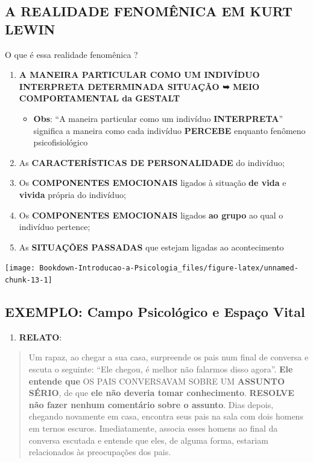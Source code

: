 \documentclass[
]{book}
\providecommand{\tightlist}{%
  \setlength{\itemsep}{0pt}\setlength{\parskip}{0pt}}
\begin{document}
\hypertarget{a-realidade-fenomuxeanica-em-kurt-lewin}{%
\subsection{A REALIDADE FENOMÊNICA EM KURT LEWIN}\label{a-realidade-fenomuxeanica-em-kurt-lewin}}

O que é essa realidade fenomênica ?

\begin{enumerate}
\def\labelenumi{\arabic{enumi}.}
\tightlist
\item
  \textbf{A MANEIRA PARTICULAR COMO UM INDIVÍDUO INTERPRETA DETERMINADA
  SITUAÇÃO ➥ MEIO COMPORTAMENTAL da GESTALT}

  \begin{itemize}
  \tightlist
  \item
    \textbf{Obs}: ``A maneira particular como um indivíduo \textbf{INTERPRETA}''
    significa a maneira como cada indivíduo \textbf{PERCEBE} enquanto
    fenômeno psicofisiológico
  \end{itemize}
\item
  As \textbf{CARACTERÍSTICAS DE PERSONALIDADE} do indivíduo;
\item
  Os \textbf{COMPONENTES EMOCIONAIS} ligados à situação \textbf{de vida} e
  \textbf{vivida} própria do indivíduo;
\item
  Os \textbf{COMPONENTES EMOCIONAIS} ligados \textbf{ao grupo} ao qual o
  indivíduo pertence;
\item
  As \textbf{SITUAÇÕES PASSADAS} que estejam ligadas ao acontecimento
\end{enumerate}

\texttt{[image: Bookdown-Introducao-a-Psicologia\_files/figure-latex/unnamed-chunk-13-1]}

\hypertarget{exemplo-campo-psicoluxf3gico-e-espauxe7o-vital}{%
\subsection{EXEMPLO: Campo Psicológico e Espaço Vital}\label{exemplo-campo-psicoluxf3gico-e-espauxe7o-vital}}

\begin{enumerate}
\def\labelenumi{\arabic{enumi}.}
\tightlist
\item
  \textbf{RELATO}:
\end{enumerate}

\begin{quote}
Um rapaz, ao chegar a sua casa, surpreende os pais num final de
conversa e escuta o seguinte: ``Ele chegou, é melhor não falarmos disso
agora''. \textbf{Ele entende que} OS PAIS CONVERSAVAM SOBRE UM \textbf{ASSUNTO
SÉRIO}, de que \textbf{ele não deveria tomar conhecimento}. \textbf{RESOLVE não
fazer nenhum comentário sobre o assunto}. Dias depois, chegando
novamente em casa, encontra seus pais na sala com dois homens em
ternos escuros. Imediatamente, associa esses homens ao final da
conversa escutada e entende que eles, de alguma forma, estariam
relacionados às preocupações dos pais.
\end{quote}
\end{document}
